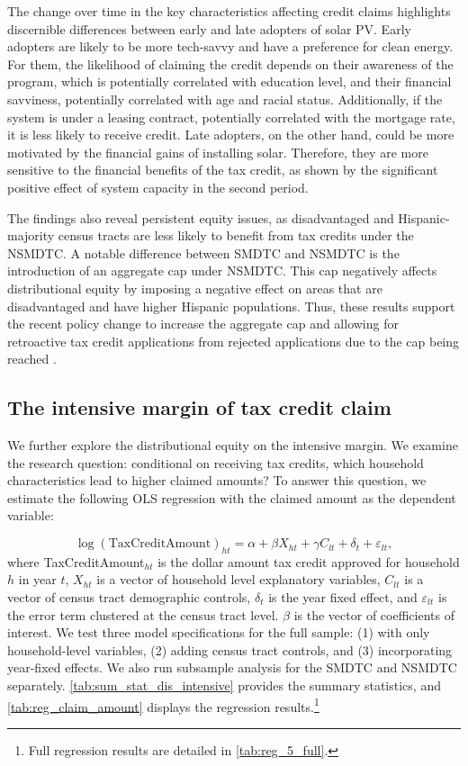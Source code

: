 \documentclass[11pt,twoside,letterpaper]{article}
\begin{document}
The change over time in the key characteristics affecting credit claims highlights discernible differences between early and late adopters of solar PV. Early adopters are likely to be more tech-savvy and have a preference for clean energy. For them, the likelihood of claiming the credit depends on their awareness of the program, which is potentially correlated with education level, and their financial savviness, potentially correlated with age and racial status. Additionally, if the system is under a leasing contract, potentially correlated with the mortgage rate, it is less likely to receive credit. Late adopters, on the other hand, could be more motivated by the financial gains of installing solar. Therefore, they are more sensitive to the financial benefits of the tax credit, as shown by the significant positive effect of system capacity in the second period.

The findings also reveal persistent equity issues, as disadvantaged and Hispanic-majority census tracts are less likely to benefit from tax credits under the NSMDTC. A notable difference between SMDTC and NSMDTC is the introduction of an aggregate cap under NSMDTC. This cap negatively affects distributional equity by imposing a negative effect on areas that are disadvantaged and have higher Hispanic populations. Thus, these results support the recent policy change to increase the aggregate cap and allowing for retroactive tax credit applications from rejected applications due to the cap being reached \parencite{newsolarcap}. 

\subsection{The intensive margin of tax credit claim}

We further explore the distributional equity on the intensive margin. We examine the research question: conditional on receiving tax credits, which household characteristics lead to higher claimed amounts? To answer this question, we estimate the following OLS regression with the claimed amount as the dependent variable:

\begin{equation}\label{reg_4}
    \log(\text{TaxCreditAmount})_{ht} = \alpha + \beta X_{ht} + \gamma C_{lt}  + \delta_t + \varepsilon_{lt},
\end{equation}
where TaxCreditAmount$_{ht}$ is the dollar amount tax credit approved for household $h$ in year $t$, $X_{ht}$ is a vector of household level explanatory variables, $C_{lt}$ is a vector of census tract demographic controls, $\delta_t$ is the year fixed effect, and $\varepsilon_{lt}$ is the error term clustered at the census tract level. $\beta$ is the vector of coefficients of interest. We test three model specifications for the full sample: (1) with only household-level variables, (2) adding census tract controls, and (3) incorporating year-fixed effects. We also run subsample analysis for the SMDTC and NSMDTC separately. \autoref{tab:sum_stat_dis_intensive} provides the summary statistics, and \autoref{tab:reg_claim_amount} displays the regression results.\footnote{Full regression results are detailed in \autoref{tab:reg_5_full}.}
\end{document}

